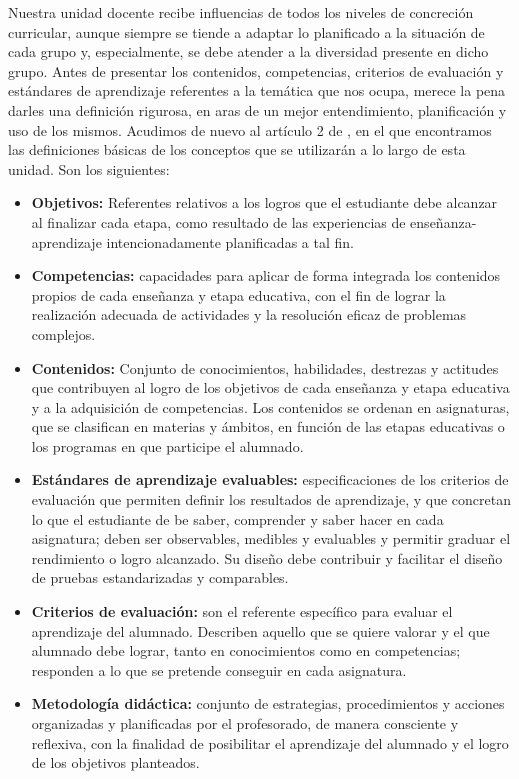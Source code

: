 \documentclass[../main.tex]{book}
\begin{document}
Nuestra unidad docente recibe influencias de todos los niveles de concreción curricular, aunque siempre se tiende a adaptar lo planificado a la situación de cada grupo y, especialmente, se debe atender a la diversidad presente en dicho grupo. Antes de presentar los contenidos, competencias, criterios de evaluación y estándares de aprendizaje referentes a la temática que nos ocupa, merece la pena darles una definición rigurosa, en aras de un mejor entendimiento, planificación y uso de los mismos. Acudimos de nuevo al artículo 2 de \cite{RD1105}, en el que encontramos las definiciones básicas de los conceptos que se utilizarán a lo largo de esta unidad. Son los siguientes:

\begin{itemize}
	\item \textbf{Objetivos: } Referentes relativos a los logros que el estudiante debe alcanzar al finalizar cada etapa, como resultado de las experiencias de enseñanza-aprendizaje intencionadamente planificadas a tal fin.
	\item \textbf{Competencias: } capacidades para aplicar de forma integrada los contenidos propios de cada enseñanza y etapa educativa, con el fin de lograr la realización adecuada de actividades y la resolución eficaz de problemas complejos.
	\item \textbf{Contenidos: } Conjunto de conocimientos, habilidades, destrezas y actitudes que contribuyen al logro de los objetivos de cada enseñanza y etapa educativa y  a la adquisición de competencias. Los contenidos se ordenan en asignaturas, que se clasifican en materias y ámbitos, en función de las etapas educativas o los programas en que participe el alumnado.
	\item \textbf{Estándares de aprendizaje evaluables: } especificaciones de los criterios de evaluación que permiten definir los resultados de aprendizaje, y que concretan lo que el estudiante de be saber, comprender y saber hacer en cada asignatura; deben ser observables, medibles y evaluables y permitir graduar el rendimiento o logro alcanzado. Su diseño debe contribuir y facilitar el diseño de pruebas estandarizadas y comparables.
	\item \textbf{Criterios de evaluación: } son el referente específico para evaluar el aprendizaje del alumnado. Describen aquello que se quiere valorar y el que alumnado debe lograr, tanto en conocimientos como en competencias; responden a lo que se pretende conseguir en cada asignatura.
	\item \textbf{Metodología didáctica: } conjunto de estrategias, procedimientos y acciones organizadas y planificadas por el profesorado, de manera consciente y reflexiva, con la finalidad de posibilitar el aprendizaje del alumnado y el logro de los objetivos planteados.
\end{itemize} 
\end{document}
